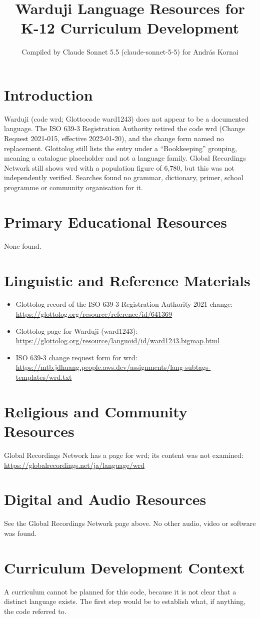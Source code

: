 \documentclass[12pt]{article}
\title{Warduji Language Resources for K-12 Curriculum Development}
\author{Compiled by Claude Sonnet 5.5 (claude-sonnet-5-5) for Andr\'as Kornai}
\date{}
\begin{document}
\maketitle

\section{Introduction}
Warduji (code wrd; Glottocode ward1243) does not appear to be a documented language. The ISO 639-3 Registration Authority retired the code wrd (Change Request 2021-015, effective 2022-01-20), and the change form named no replacement. Glottolog still lists the entry under a ``Bookkeeping'' grouping, meaning a catalogue placeholder and not a language family. Global Recordings Network still shows wrd with a population figure of 6,780, but this was not independently verified. Searches found no grammar, dictionary, primer, school programme or community organisation for it.

\section{Primary Educational Resources}
None found.

\section{Linguistic and Reference Materials}
\begin{itemize}
\item Glottolog record of the ISO 639-3 Registration Authority 2021 change: \url{https://glottolog.org/resource/reference/id/641369}
\item Glottolog page for Warduji (ward1243): \url{https://glottolog.org/resource/languoid/id/ward1243.bigmap.html}
\item ISO 639-3 change request form for wrd: \url{https://mtb.jdhuang.people.aws.dev/assignments/lang-subtags-templates/wrd.txt}
\end{itemize}

\section{Religious and Community Resources}
Global Recordings Network has a page for wrd; its content was not examined: \url{https://globalrecordings.net/ja/language/wrd}

\section{Digital and Audio Resources}
See the Global Recordings Network page above. No other audio, video or software was found.

\section{Curriculum Development Context}
A curriculum cannot be planned for this code, because it is not clear that a distinct language exists. The first step would be to establish what, if anything, the code referred to.
\end{document}
